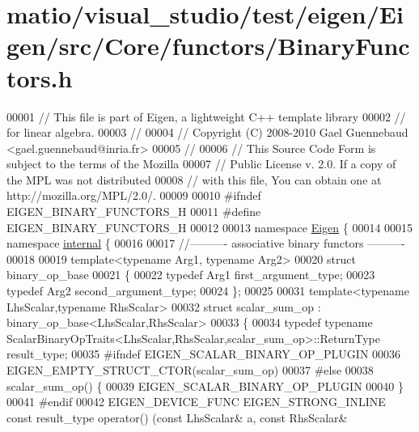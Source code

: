 \hypertarget{matio_2visual__studio_2test_2eigen_2_eigen_2src_2_core_2functors_2_binary_functors_8h_source}{}\section{matio/visual\+\_\+studio/test/eigen/\+Eigen/src/\+Core/functors/\+Binary\+Functors.h}
\label{matio_2visual__studio_2test_2eigen_2_eigen_2src_2_core_2functors_2_binary_functors_8h_source}

\begin{DoxyCode}
00001 \textcolor{comment}{// This file is part of Eigen, a lightweight C++ template library}
00002 \textcolor{comment}{// for linear algebra.}
00003 \textcolor{comment}{//}
00004 \textcolor{comment}{// Copyright (C) 2008-2010 Gael Guennebaud <gael.guennebaud@inria.fr>}
00005 \textcolor{comment}{//}
00006 \textcolor{comment}{// This Source Code Form is subject to the terms of the Mozilla}
00007 \textcolor{comment}{// Public License v. 2.0. If a copy of the MPL was not distributed}
00008 \textcolor{comment}{// with this file, You can obtain one at http://mozilla.org/MPL/2.0/.}
00009 
00010 \textcolor{preprocessor}{#ifndef EIGEN\_BINARY\_FUNCTORS\_H}
00011 \textcolor{preprocessor}{#define EIGEN\_BINARY\_FUNCTORS\_H}
00012 
00013 \textcolor{keyword}{namespace }\hyperlink{namespace_eigen}{Eigen} \{
00014 
00015 \textcolor{keyword}{namespace }\hyperlink{namespaceinternal}{internal} \{
00016 
00017 \textcolor{comment}{//---------- associative binary functors ----------}
00018 
00019 \textcolor{keyword}{template}<\textcolor{keyword}{typename} Arg1, \textcolor{keyword}{typename} Arg2>
00020 \textcolor{keyword}{struct }binary\_op\_base
00021 \{
00022   \textcolor{keyword}{typedef} Arg1 first\_argument\_type;
00023   \textcolor{keyword}{typedef} Arg2 second\_argument\_type;
00024 \};
00025 
00031 \textcolor{keyword}{template}<\textcolor{keyword}{typename} LhsScalar,\textcolor{keyword}{typename} RhsScalar>
00032 \textcolor{keyword}{struct }scalar\_sum\_op : binary\_op\_base<LhsScalar,RhsScalar>
00033 \{
00034   \textcolor{keyword}{typedef} \textcolor{keyword}{typename} ScalarBinaryOpTraits<LhsScalar,RhsScalar,scalar\_sum\_op>::ReturnType result\_type;
00035 \textcolor{preprocessor}{#ifndef EIGEN\_SCALAR\_BINARY\_OP\_PLUGIN}
00036   EIGEN\_EMPTY\_STRUCT\_CTOR(scalar\_sum\_op)
00037 \textcolor{preprocessor}{#else}
00038   scalar\_sum\_op() \{
00039     EIGEN\_SCALAR\_BINARY\_OP\_PLUGIN
00040   \}
00041 \textcolor{preprocessor}{#endif}
00042   EIGEN\_DEVICE\_FUNC EIGEN\_STRONG\_INLINE \textcolor{keyword}{const} result\_type operator() (\textcolor{keyword}{const} LhsScalar& a, \textcolor{keyword}{const} RhsScalar& 

\end{DoxyCode}
